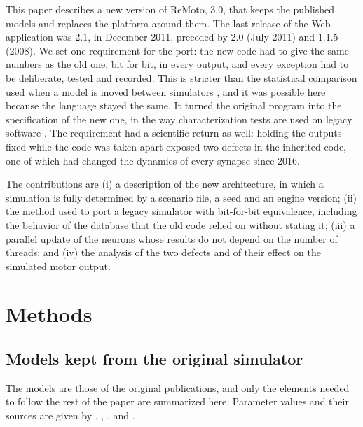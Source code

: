 \documentclass[pdflatex,sn-apa,iicol]{sn-jnl}
\begin{document}
This paper describes a new version of ReMoto, 3.0, that keeps the published models and replaces the platform around them. The last release of the Web application was 2.1, in December 2011, preceded by 2.0 (July 2011) and 1.1.5 (2008).
We set one requirement for the port: the new code had to give the same numbers as the old one, bit for bit, in every output, and every exception had to be deliberate, tested and recorded. This is stricter than the statistical comparison used when a model is moved between simulators \citep{Gutzen2018,Trensch2018}, and it was possible here because the language stayed the same. It turned the original program into the specification of the new one, in the way characterization tests are used on legacy software \citep{Feathers2004}. The requirement had a scientific return as well: holding the outputs fixed while the code was taken apart exposed two defects in the inherited code, one of which had changed the dynamics of every synapse since 2016.

The contributions are (i) a description of the new architecture, in which a simulation is fully determined by a scenario file, a seed and an engine version; (ii) the method used to port a legacy simulator with bit-for-bit equivalence, including the behavior of the database that the old code relied on without stating it; (iii) a parallel update of the neurons whose results do not depend on the number of threads; and (iv) the analysis of the two defects and of their effect on the simulated motor output.

\section{Methods}\label{sec:methods}

\subsection{Models kept from the original simulator}\label{sec:models}

The models are those of the original publications, and only the elements needed to follow the rest of the paper are summarized here. Parameter values and their sources are given by \citet{Cisi2008}, \citet{Elias2012}, \citet{Elias2013}, \citet{Watanabe2013} and \citet{Elias2014}.
\end{document}

